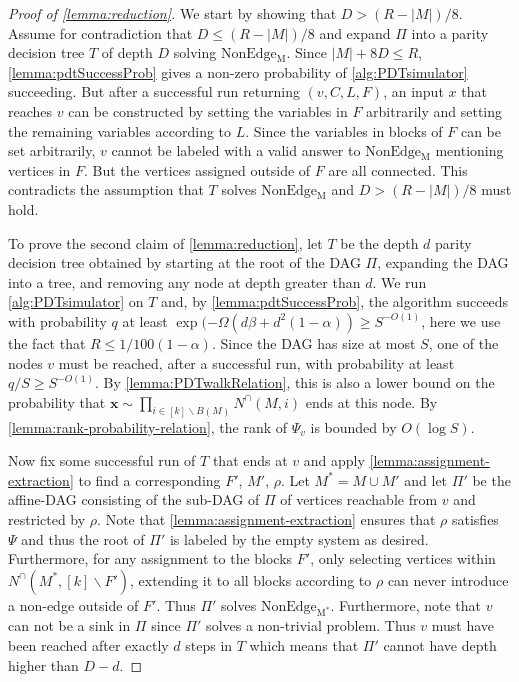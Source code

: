 \documentclass[10pt,a4paper]{article}
\theoremstyle{definition}
\theoremstyle{remark}
\theoremstyle{example}
\theoremstyle{plain}
\renewcommand{\setminus}{\smallsetminus}
\newcommand{\CNbound}{R}
\newcommand{\affineDAG}{\Pi}
\newcommand{\edgeProbResLin}{\alpha}
\newcommand{\rbound}{1/100(1-\edgeProbResLin)}
\begin{document}
{}{
\lemmareduction*
\begin{proof}[Proof of \autoref{lemma:reduction}]

        We start by showing that $D > (\CNbound-|M|)/8$. Assume for contradiction that $D \leq (\CNbound -|M|)/8$ and expand $\affineDAG$ into a parity decision tree $T$ of depth $D$ solving $\mathrm{NonEdge_M}$. Since $|M| + 8D \leq R$, \autoref{lemma:pdtSuccessProb} gives a non-zero probability of \autoref{alg:PDTsimulator} succeeding. But after a successful run returning $(v, C,L,F)$, an input $x$ that reaches $v$ can be constructed by setting the variables in $F$ arbitrarily and setting the remaining variables according to $L$. Since the variables in blocks of $F$ can be set arbitrarily, $v$ cannot be labeled with a valid answer to $\mathrm{NonEdge_M}$ mentioning vertices in $F$. But the vertices assigned outside of $F$ are all connected. This contradicts the assumption that $T$ solves $\mathrm{NonEdge_M}$ and $D>(R-|M|)/8$ must hold. 
        
        To prove the second claim of \autoref{lemma:reduction}, let $T$ be the depth $d$ parity decision tree obtained by starting at the root of the DAG $\affineDAG$, expanding the DAG into a tree, and removing any node at depth greater than $d$. We run \autoref{alg:PDTsimulator} on $T$ and, by \autoref{lemma:pdtSuccessProb}, the algorithm succeeds with probability $q$ at least $\exp(-\Omega(d\beta+d^2(1-\edgeProbResLin))\geq S^{-O(1)}$, here we use the fact that $\CNbound\leq \rbound$. Since the DAG has size at most $S$, one of the nodes $v$ must be reached, after a successful run, with probability at least $q/S \geq S^{-O(1)}$.
        By \autoref{lemma:PDTwalkRelation}, this is also a lower bound on the probability that $\bm x \sim \prod_{i \in [k] \setminus B(M)} N^\cap(M,i)$ ends at this node. By \autoref{lemma:rank-probability-relation}, the rank of $\Psi_v$ is bounded by $O(\log S)$. 

        Now fix some successful run of $T$ that ends at $v$ and apply \autoref{lemma:assignment-extraction} to find a corresponding $F'$, $M'$, $\rho$. Let $M^* = M\cup M'$ and let $\affineDAG'$ be the affine-DAG consisting of the sub-DAG of $\affineDAG$ of vertices reachable from $v$ and restricted by $\rho$. Note that \autoref{lemma:assignment-extraction} ensures that $\rho$ satisfies $\Psi$ and thus the root of $\affineDAG'$ is labeled by the empty system as desired. Furthermore, for any assignment to the blocks $F'$, only selecting vertices within $N^\cap(M^*,[k]\setminus F')$, extending it to all blocks according to $\rho$ can never introduce a non-edge outside of $F'$. Thus $\affineDAG'$ solves $\mathrm{NonEdge_{M^*}}$. Furthermore, note that $v$ can not be a sink in $\affineDAG$ since $\affineDAG'$ solves a non-trivial problem. Thus $v$ must have been reached after exactly $d$ steps in $T$ which means that $\affineDAG'$ cannot have depth higher than $D-d$.
       
\end{proof}
}
\end{document}

